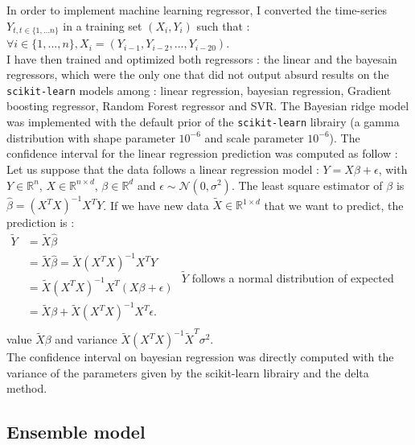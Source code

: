 In order to implement machine learning regressor, I converted the time-series $Y_{t,  t \in \{1, \hdots n\}}$ in a training set $(X_i, Y_i)$ such that : \\
$\forall i \in \{1, ..., n\}, X_i = (Y_{i-1}, Y_{i-2}, ..., Y_{i-20})$.\\

I have then trained and optimized both regressors : the linear and the bayesain regressors, which were the only one that did not output absurd results on the \texttt{scikit-learn} models among : linear regression, bayesian regression, Gradient boosting regressor, Random Forest regressor and SVR. 
The Bayesian ridge model was implemented with the default prior of the \texttt{scikit-learn} librairy (a gamma distribution with shape parameter $10^{-6}$ and scale parameter $10^{-6}$).
The confidence interval for the linear regression prediction was computed as follow : \\
Let us suppose that the data follows a linear regression model : $Y = X\beta + \epsilon$, with $Y \in \mathbb{R}^n$, $X \in \mathbb{R}^{n \times d}$, $\beta \in \mathbb{R}^d$ and $\epsilon \sim \mathcal{N}(0, \sigma^2)$.
The least square estimator of $\beta$ is $\hat{\beta} = (X^T X)^{-1} X^T Y$.
If we have new data $\tilde{X} \in \mathbb{R}^{1 \times d}$ that we want to predict, the prediction is  : \\

$
\begin{aligned}
    \tilde{Y} & = \tilde{X} \hat{\beta} \\
    &  = \tilde{X} \hat{\beta} = \tilde{X} (X^T X)^{-1} X^T Y \\
    &  = \tilde{X} (X^T X)^{-1} X^T (X\beta + \epsilon) \\
    &  = \tilde{X} \beta + \tilde{X} (X^T X)^{-1} X^T \epsilon.\\
\end{aligned}
$
\newline
$\tilde{Y}$ follows a normal distribution of expected value $\tilde{X} \beta$ and variance $\tilde{X} (X^T X)^{-1} \tilde{X}^T \sigma ^2$.\\
The confidence interval on bayesian regression was directly computed with the variance of the parameters given by the scikit-learn librairy and the delta method. 

\subsection{Ensemble model}

